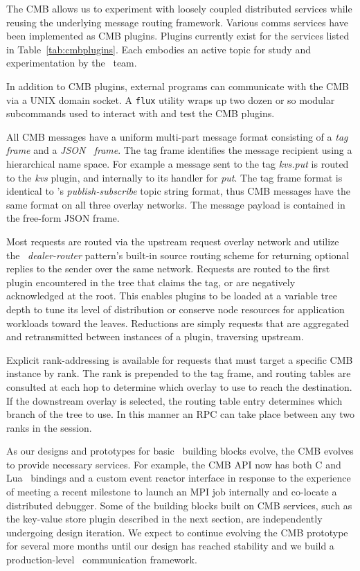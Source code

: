 The CMB allows us to experiment with loosely coupled distributed services
while reusing the underlying message routing framework.  Various comms
services have been implemented as CMB plugins.  Plugins currently exist for
the services listed in Table~\ref{tab:cmbplugins}.
Each embodies an active topic for study and experimentation by the \flux\ team.

In addition to CMB plugins, external programs can communicate with the CMB
via a UNIX domain socket.  A {\tt flux} utility wraps up two dozen or so
modular subcommands used to interact with and test the CMB plugins.

All CMB messages have a uniform multi-part message format consisting of
a {\em tag frame} and a {\em JSON~\cite{rfc4627} frame}.  The tag frame identifies the
message recipient using a hierarchical name space.  For example a message
sent to the tag {\em kvs.put} is routed to the {\em kvs} plugin, and internally
to its handler for {\em put}.  The tag frame format is identical to
\zMQ's {\em publish-subscribe} topic string format, thus CMB messages
have the same format on all three overlay networks.
The message payload is contained in the free-form JSON frame.

Most requests are routed via the upstream request overlay network
and utilize the \zMQ\ {\em dealer-router} pattern's built-in source routing
scheme for returning optional replies to the sender over the same network.
Requests are routed to the first plugin encountered in the tree that claims
the tag, or are negatively acknowledged at the root.  This enables plugins
to be loaded at a variable tree depth to tune its level of distribution
or conserve node resources for application workloads toward the leaves.
Reductions are simply requests that are aggregated and retransmitted between
instances of a plugin, traversing upstream.

Explicit rank-addressing is available for requests that must target a
specific CMB instance by rank.  The rank is prepended to the tag frame,
and routing tables are consulted at each hop to determine which overlay
to use to reach the destination.  If the downstream overlay is selected,
the routing table entry determines which branch of the tree to use.
In this manner an RPC can take place between any two ranks in the session.

As our designs and prototypes for basic \flux\ building blocks evolve,
the CMB evolves to provide necessary services.  For example, the CMB API
now has both C and Lua~\cite{LuaBook}  bindings and a custom event reactor interface in
response to the experience of meeting a recent milestone to launch an
MPI job internally and co-locate a distributed debugger.  Some of the building
blocks built on CMB services, such as the key-value store plugin described
in the next section, are independently undergoing design iteration.
We expect to continue evolving the CMB prototype for several more months until
our design has reached stability and we build a production-level \flux\ 
communication framework.
